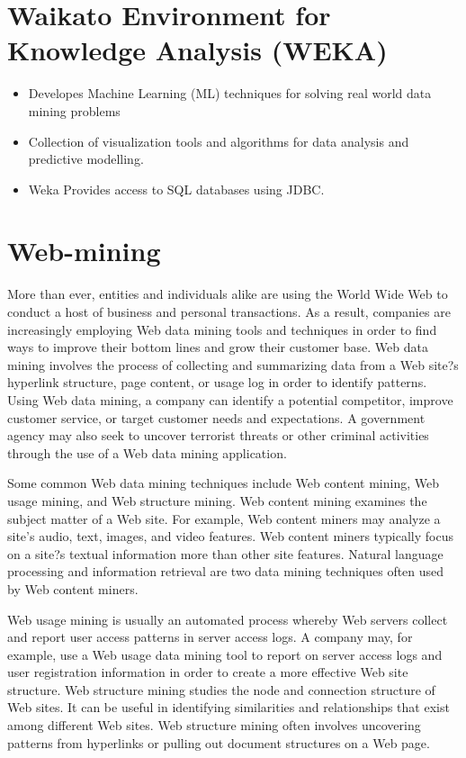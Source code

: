 \documentclass[11pt]{article} %
\begin{document}
\section{Waikato Environment for Knowledge Analysis (WEKA)}

\begin{itemize}
\item Developes Machine Learning (ML) techniques for solving real world data mining problems
\item Collection of visualization tools and algorithms for data analysis and predictive modelling.
\item Weka Provides access to SQL databases using JDBC.
\end{itemize}

\newpage
\section{Web-mining}
More than ever, entities and individuals alike are using the World Wide Web to conduct a host of business and personal transactions. As a result, companies are increasingly employing Web data mining tools and techniques in order to find ways to improve their bottom lines and grow their customer base. Web data mining involves the process of collecting and summarizing data from a Web site?s hyperlink structure, page content, or usage log in order to identify patterns. Using Web data mining, a company can identify a potential competitor, improve customer service, or target customer needs and expectations. A government agency may also seek to uncover terrorist threats or other criminal activities through the use of a Web data mining application.

Some common Web data mining techniques include Web content mining, Web usage mining, and Web structure mining. Web content mining examines the subject matter of a Web site. For example, Web content miners may analyze a site's audio, text, images, and video features. Web content miners typically focus on a site?s textual information more than other site features. Natural language processing and information retrieval are two data mining techniques often used by Web content miners.

Web usage mining is usually an automated process whereby Web servers collect and report user access patterns in server access logs. A company may, for example, use a Web usage data mining tool to report on server access logs and user registration information in order to create a more effective Web site structure. Web structure mining studies the node and connection structure of Web sites. It can be useful in identifying similarities and relationships that exist among different Web sites. Web structure mining often involves uncovering patterns from hyperlinks or pulling out document structures on a Web page.
\end{document}

